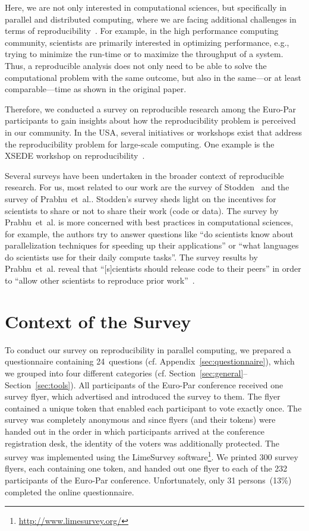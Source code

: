 \documentclass{article}\usepackage[]{graphicx}\usepackage[]{color}
\makeatletter
\newcommand{\append}{Appendix\xspace}
\newcommand{\Sec}{Section\xspace}
\newcommand{\eg}{e.g.\xspace}
\newcommand{\etal}{et~al.\@\xspace}
\newcommand{\cf}{cf.\@\xspace}
\newcommand{\europar}{Euro-Par\xspace}
\newcommand{\runtime}{run-time\xspace}
\makeatother
\begin{document}
Here, we are not only interested in computational sciences, but
specifically in parallel and distributed computing, where we are
facing additional challenges in terms of
reproducibility~\cite{HunoldT13}. For example, in the high performance
computing community, scientists are primarily interested in optimizing
performance, \eg, trying to minimize the \runtime or to maximize the
throughput of a system. Thus, a reproducible analysis does not only
need to be able to solve the computational problem with the same
outcome, but also in the same---or at least comparable---time as shown
in the original paper.

Therefore, we conducted a survey on reproducible research among the
Euro-Par participants to gain insights about how the reproducibility
problem is perceived in our community. In the USA, several initiatives
or workshops exist that address the reproducibility problem for
large-scale computing. One example is the XSEDE workshop on
reproducibility~\cite{JamesWS14}.

Several surveys have been undertaken in the broader context of
reproducible research. For us, most related to our work are the survey
of Stodden~\cite{stodden:reproducibility} and the survey of
Prabhu~\etal \cite{Prabhu:2011}.  Stodden's survey sheds light on the
incentives for scientists to share or not to share their work (code or
data). The survey by Prabhu~\etal is more concerned with best
practices in computational sciences, for example, the authors try to
answer questions like ``do scientists know about parallelization
techniques for speeding up their applications'' or ``what languages do
scientists use for their daily compute tasks''. The survey results by
Prabhu~\etal reveal that ``[s]cientists should release code to their
peers'' in order to ``allow other scientists to reproduce prior
work''~\cite{Prabhu:2011}.

\section{Context of the Survey}
\label{sec:survey}

To conduct our survey on reproducibility in parallel computing, we
prepared a questionnaire containing 24~questions (\cf
\append~\ref{sec:questionnaire}), which we grouped into four different
categories (\cf \Sec~\ref{sec:general}--\Sec~\ref{sec:tools}). All
participants of the \europar conference received one survey
flyer, which advertised and introduced the survey to them. The flyer
contained a unique token that enabled each participant to vote exactly
once. The survey was completely anonymous and since flyers (and their
tokens) were handed out in the order in which participants arrived at
the conference registration desk, the identity of the voters was
additionally protected. The survey was implemented using the
LimeSurvey software\footnote{\url{http://www.limesurvey.org/}}.  We
printed 300 survey flyers, each containing one token, and handed out
one flyer to each of the 232 participants of the \europar
conference. Unfortunately, only 31 persons~(13\%) completed the online questionnaire.
\end{document}
